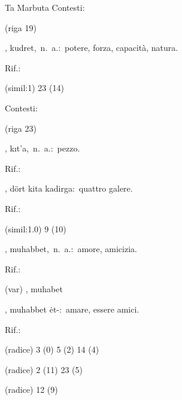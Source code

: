 \begin{glossario}{Ta Marbuta}
Contesti:
\begin{subvocedue}
\item[(riga 19)] 
\end{subvocedue}
\item[{\color{colorlowref}\spzrl{qudrat}},] {\sf kudret},\ n.\ a.:\ potere, forza, capacità, natura.
\begin{subvocedue}
\item[Rif.:] 
\end{subvocedue}
\begin{subvocedue}
\item[(simil:1)]   23 (14)
\end{subvocedue}


Contesti:
\begin{subvocedue}
\item[(riga 23)] 
\end{subvocedue}
\item[{\color{colorlowref}\spzrl{qi.ta`a_T}},] {\sf kıt'a},\ n.\ a.:\ pezzo.
\begin{subvocedue}
\item[Rif.:] 
\end{subvocedue}
\begin{subvocedue}
\item[\subglossariobullet] , {\sf dört kita kadirga}:\ quattro galere.
\begin{subvocedue}
\item[Rif.:] 
\end{subvocedue}
\item[(simil:1.0)]   9 (10)
\end{subvocedue}
\item[{\color{colorlowref}\spzrl{mu.habba_T}},] {\sf muhabbet},\ n.\ a.:\ amore, amicizia.
\begin{subvocedue}
\item[Rif.:] 
\end{subvocedue}
\begin{subvocedue}
\item[(var)] , {\sf muhabet}\item[\subglossariobullet] , {\sf muhabbet ėt-}:\ amare, essere amici.
\begin{subvocedue}
\item[Rif.:] 
\end{subvocedue}
\item[(radice)]   3 (0) 5 (2) 14 (4)
\item[(radice)]   2 (11) 23 (5)
\item[(radice)]   12 (9)
\end{subvocedue}



\end{glossario}

